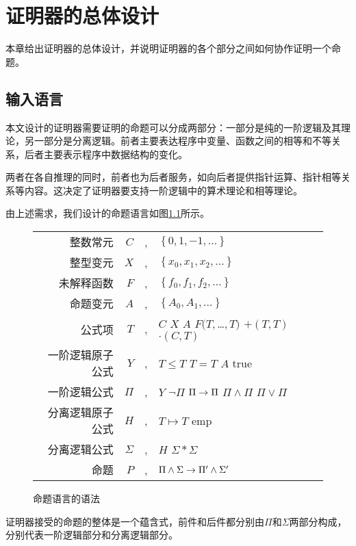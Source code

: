 \chapter{证明器的总体设计}
\label{chap:struct}
本章给出证明器的总体设计，并说明证明器的各个部分之间如何协作证明一个命题。

\section{输入语言}
本文设计的证明器需要证明的命题可以分成两部分：一部分是纯的一阶逻辑及其理论，另一部分是分离逻辑。前者主要表达程序中变量、函数之间的相等和不等关系，后者主要表示程序中数据结构的变化。

两者在各自推理的同时，前者也为后者服务，如向后者提供指针运算、指针相等关系等内容。这决定了证明器要支持一阶逻辑中的算术理论和相等理论。

由上述需求，我们设计的命题语言如图\ref{struct:syntax}所示。

\begin{figure}[!htbp]
  \centering
  \begin{tabular}{rrcl}
    整数常元 & $C$ & \sep & $\left\{ 0, 1, -1, \ldots \right\}$ \\
    整型变元 & $X$ & \sep & $\left\{ x_0, x_1, x_2, \ldots \right\}$ \\
    未解释函数 & $F$ & \sep & $\left\{ f_0, f_1, f_2, \ldots \right\}$ \\
    命题变元 & $A$ & \sep & $\left\{ A_0, A_1, \ldots \right\}$ \\
    公式项  & $T$ & \sep & $C$ \deli{} $X$ \deli{} $A$ \deli{} $F(T,$\ldots$,T)$ \deli{} $+(T, T)$ \deli{} $\cdot(C,T)$ \\
    一阶逻辑原子公式 & $Y$ & \sep{} & $T \le T$ \deli{} $T = T$ \deli{} $A$ \deli{} $\mathrm{true}$ \\
    一阶逻辑公式 & $\Pi$ & \sep{} & $Y$ \deli{}  $\lnot \Pi$ \deli{} $\Pi \rightarrow \Pi$ \deli{} $\Pi \land \Pi$ \deli{} $\Pi \lor \Pi$ \\
    分离逻辑原子公式 & $H$ & \sep{} & $T \mapsto T$ \deli{} $\mathrm{emp}$ \\
    分离逻辑公式 & $\Sigma$ & \sep{} & $H$ \deli{} $\Sigma \ast \Sigma$ \\
    命题 & $P$ & \sep & $ \Pi \land \Sigma \rightarrow \Pi' \land \Sigma' $
  \end{tabular}
  \caption{命题语言的语法}
  \label{struct:syntax}
\end{figure}

证明器接受的命题的整体是一个蕴含式，前件和后件都分别由$\Pi$和$\Sigma$两部分构成，分别代表一阶逻辑部分和分离逻辑部分。

